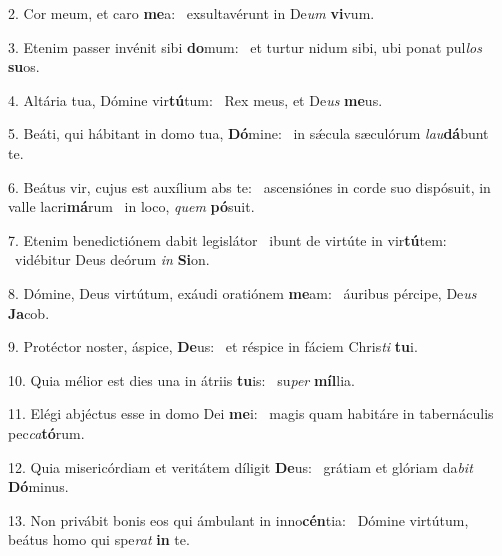2. Cor meum, et caro \textbf{me}a: \ast\  exsultavérunt in De\textit{um} \textbf{vi}vum.\

3. Etenim passer invénit sibi \textbf{do}mum: \ast\  et turtur nidum sibi, ubi ponat pul\textit{los} \textbf{su}os.\

4. Altária tua, Dómine vir\textbf{tú}tum: \ast\  Rex meus, et De\textit{us} \textbf{me}us.\

5. Beáti, qui hábitant in domo tua, \textbf{Dó}mine: \ast\  in sǽcula sæculórum \textit{lau}\textbf{dá}bunt te.\

6. Beátus vir, cujus est auxílium abs te: \dag\  ascensiónes in corde suo dispósuit, in valle lacri\textbf{má}rum \ast\  in loco, \textit{quem} \textbf{pó}suit.\

7. Etenim benedictiónem dabit legislátor \dag\  ibunt de virtúte in vir\textbf{tú}tem: \ast\  vidébitur Deus deórum \textit{in} \textbf{Si}on.\

8. Dómine, Deus virtútum, exáudi oratiónem \textbf{me}am: \ast\  áuribus pércipe, De\textit{us} \textbf{Ja}cob.\

9. Protéctor noster, áspice, \textbf{De}us: \ast\  et réspice in fáciem Chris\textit{ti} \textbf{tu}i.\

10. Quia mélior est dies una in átriis \textbf{tu}is: \ast\  su\textit{per} \textbf{míl}lia.\

11. Elégi abjéctus esse in domo Dei \textbf{me}i: \ast\  magis quam habitáre in tabernáculis pec\textit{ca}\textbf{tó}rum.\

12. Quia misericórdiam et veritátem díligit \textbf{De}us: \ast\  grátiam et glóriam da\textit{bit} \textbf{Dó}minus.\

13. Non privábit bonis eos qui ámbulant in inno\textbf{cén}tia: \ast\  Dómine virtútum, beátus homo qui spe\textit{rat} \textbf{in} te.\

